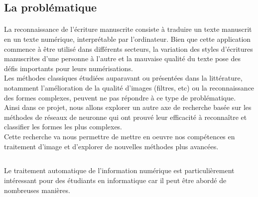 \documentclass[a4paper]{article}
\begin{document}
		\subsection{La problématique}
			\paragraph{}
				La reconnaissance de l'écriture manuscrite consiste à traduire un texte manuscrit en un texte numérique, interprétable par l'ordinateur. Bien que cette application commence à être utilisé dans différents secteurs, 
				la variation des styles d'écritures manuscrites d'une personne à l'autre et la mauvaise qualité du texte pose des défis importants pour leurs numérisations.%
\\Les méthodes classiques étudiées auparavant ou présentées dans la littérature, notamment l'amélioration de la qualité d'images (filtres, etc) ou la reconnaissance des formes complexes, peuvent ne pas répondre à ce type de problématique.
\\Ainsi dans ce projet, nous allons explorer un autre axe de recherche basée sur les méthodes de réseaux de neuronne qui ont prouvé leur efficacité à reconnaître et classifier les formes les plus complexes.
\\Cette recherche va nous permettre de mettre en oeuvre nos compétences en traitement d'image et d'explorer de nouvelles méthodes plus avancées.

		\subsection*{}
			Le traitement automatique de l'information numérique est particulièrement intéressant pour des étudiants en informatique car il peut être abordé de nombreuses manières. 
\end{document}
